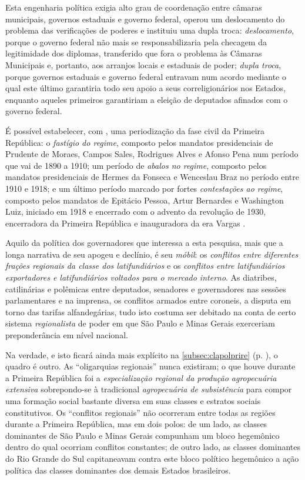 Esta engenharia política exigia alto grau de coordenação entre câmaras municipais, governos estaduais e governo federal, operou um deslocamento do problema das verificações de poderes e instituiu uma dupla troca: \textit{deslocamento}, porque o governo federal não mais se responsabilizaria pela checagem da legitimidade dos diplomas, transferido que fora o problema às Câmaras Municipais e, portanto, aos arranjos locais e estaduais de poder; \textit{dupla troca}, porque governos estaduais e governo federal entravam num acordo mediante o qual este último garantiria todo seu apoio a seus correligionários nos Estados, enquanto aqueles primeiros garantiriam a eleição de deputados afinados com o governo federal.

É possível estabelecer, com , uma periodização da fase civil da Primeira República: o \textit{fastígio do regime}, composto pelos mandatos presidenciais de Prudente de Moraes, Campos Sales, Rodrigues Alves e Afonso Pena num período que vai de 1890 a 1910; um período de \textit{abalos no regime}, composto pelos mandatos presidenciais de Hermes da Fonseca e Wenceslau Braz no período entre 1910 e 1918; e um último período marcado por fortes \textit{contestações ao regime}, composto pelos mandatos de Epitácio Pessoa, Artur Bernardes e Washington Luiz, iniciado em 1918 e encerrado com o advento da revolução de 1930, encerradora da Primeira República e inauguradora da era Vargas \cite{carone_evolucao_1977}. 

Aquilo da política dos governadores que interessa a esta pesquisa, mais que a longa narrativa de seu apogeu e declínio, é seu \textit{móbil}: os \textit{conflitos entre diferentes frações regionais da classe dos latifundiários} e os \textit{conflitos entre latifundiários exportadores e latifundiários voltados para o mercado interno}. As diatribes, catilinárias e polêmicas entre deputados, senadores e governadores nas sessões parlamentares e na imprensa, os conflitos armados entre coroneis, a disputa em torno das tarifas alfandegárias, tudo isto costuma ser debitado na conta de certo sistema \textit{regionalista} de poder em que São Paulo e Minas Gerais exerceriam preponderância em nível nacional. 

Na verdade, e isto ficará ainda mais explícito na \autoref{subsec:clapolprire} (p. \pageref{subsec:clapolprire}), o quadro é outro. As ``oligarquias regionais'' nunca existiram; o que houve durante a Primeira República foi a \textit{especialização regional da produção agropecuária extensiva} sobrepondo-se à tradicional \textit{agropecuária de subsistência} para compor uma formação social bastante diversa em suas classes e estratos sociais constitutivos. Os ``conflitos regionais'' não ocorreram entre todas as regiões durante a Primeira República, mas em dois polos: de um lado, as classes dominantes de São Paulo e Minas Gerais compunham um bloco hegemônico dentro do qual ocorriam conflitos constantes; de outro lado, as classes dominantes do Rio Grande do Sul capitaneavam contra este bloco político hegemônico a ação política das classes dominantes dos demais Estados brasileiros.

